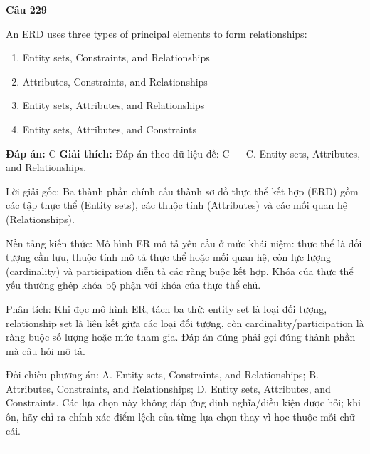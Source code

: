 \documentclass[11pt,a4paper]{article}
\newenvironment{question}[1]{%
  \par\vspace{1em}\noindent\textbf{\large Câu #1}\par\vspace{0.4em}
}{%
  \par\vspace{1em}\hrule\vspace{0.6em}
}
\newenvironment{choices}{%
  \begin{enumerate}[label=\textbf{\Alph*.},leftmargin=2.2em,itemsep=2pt,topsep=3pt]
}{%
  \end{enumerate}
}
\newcommand{\choice}{\item}
\begin{document}
\begin{question}{229}
An ERD uses three types of principal elements to form relationships:
\begin{choices}
\choice Entity sets, Constraints, and Relationships
\choice Attributes, Constraints, and Relationships
\choice Entity sets, Attributes, and Relationships
\choice Entity sets, Attributes, and Constraints
\end{choices}
\textbf{Đáp án:} C
\textbf{Giải thích:} Đáp án theo dữ liệu đề: C — C. Entity sets, Attributes, and Relationships.

Lời giải gốc: Ba thành phần chính cấu thành sơ đồ thực thể kết hợp (ERD) gồm các tập thực thể (Entity sets), các thuộc tính (Attributes) và các mối quan hệ (Relationships).

Nền tảng kiến thức: Mô hình ER mô tả yêu cầu ở mức khái niệm: thực thể là đối tượng cần lưu, thuộc tính mô tả thực thể hoặc mối quan hệ, còn lực lượng (cardinality) và participation diễn tả các ràng buộc kết hợp. Khóa của thực thể yếu thường ghép khóa bộ phận với khóa của thực thể chủ.

Phân tích: Khi đọc mô hình ER, tách ba thứ: entity set là loại đối tượng, relationship set là liên kết giữa các loại đối tượng, còn cardinality/participation là ràng buộc số lượng hoặc mức tham gia. Đáp án đúng phải gọi đúng thành phần mà câu hỏi mô tả.

Đối chiếu phương án: A. Entity sets, Constraints, and Relationships; B. Attributes, Constraints, and Relationships; D. Entity sets, Attributes, and Constraints. Các lựa chọn này không đáp ứng định nghĩa/điều kiện được hỏi; khi ôn, hãy chỉ ra chính xác điểm lệch của từng lựa chọn thay vì học thuộc mỗi chữ cái.
\end{question}
\end{document}
